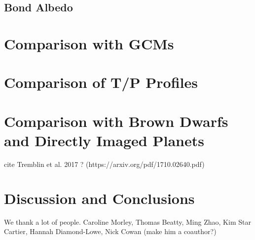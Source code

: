 \documentclass[twocolumn]{aastex61}
\begin{document}
\subsection{Bond Albedo}

\section{Comparison with GCMs}

\section{Comparison of T/P Profiles}

\section{Comparison with Brown Dwarfs and Directly Imaged Planets}
cite Tremblin et al. 2017 ? (https://arxiv.org/pdf/1710.02640.pdf)

\section{Discussion and Conclusions}

\acknowledgments
We thank a lot of people. Caroline Morley, Thomas Beatty, Ming Zhao, Kim Star Cartier, Hannah Diamond-Lowe, Nick Cowan (make him a coauthor?)



\end{document}
